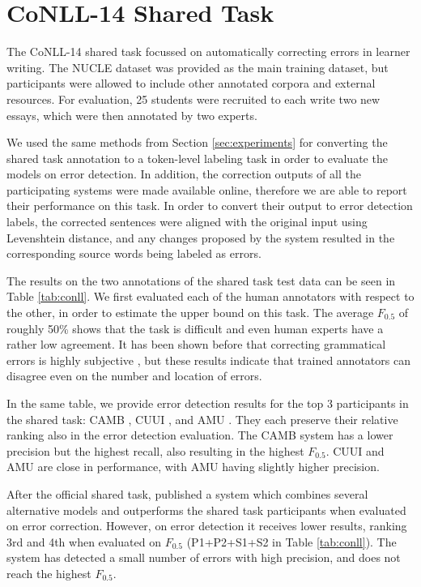 \documentclass[11pt]{article}
\begin{document}
\section{CoNLL-14 Shared Task}
\label{sec:conll}








The CoNLL-14 shared task \cite{Ng2013a} focussed on automatically correcting errors in learner writing. The NUCLE dataset was provided as the main training dataset, but participants were allowed to include other annotated corpora and external resources. For evaluation, 25 students were recruited to each write two new essays, which were then annotated by two experts.

We used the same methods from Section \ref{sec:experiments} for converting the shared task annotation to a token-level labeling task in order to evaluate the models on error detection. In addition, the correction outputs of all the participating systems were made available online, therefore we are able to report their performance on this task. 
In order to convert their output to error detection labels, the corrected sentences were aligned with the original input using Levenshtein distance, and any changes proposed by the system resulted in the corresponding source words being labeled as errors.

The results on the two annotations of the shared task test data can be seen in Table \ref{tab:conll}.
We first evaluated each of the human annotators with respect to the other, in order to estimate the upper bound on this task. The average $F_{0.5}$ of roughly 50\% shows that the task is difficult and even human experts have a rather low agreement. It has been shown before that correcting grammatical errors is highly subjective \cite{Bryant2015}, but these results indicate that trained annotators can disagree even on the number and location of errors.

In the same table, we provide error detection results for the top 3 participants in the shared task: CAMB \cite{Felice2014}, CUUI \cite{Rozovskaya2014}, and AMU \cite{Junczys-Dowmunt2014}. They each preserve their relative ranking also in the error detection evaluation. The CAMB system has a lower precision but the highest recall, also resulting in the highest $F_{0.5}$. CUUI and AMU are close in performance, with AMU having slightly higher precision. 

After the official shared task,  published a system which combines several alternative models and outperforms the shared task participants when evaluated on error correction. However, on error detection it receives lower results, ranking 3rd and 4th when evaluated on $F_{0.5}$  (P1+P2+S1+S2 in Table \ref{tab:conll}). The system has detected a small number of errors with high precision, and does not reach the highest $F_{0.5}$.
\end{document}
